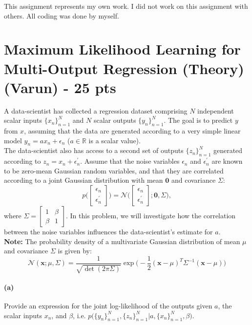 \documentclass{exam}
\def\R{\mathbb{R}}
\begin{document}
This assignment represents my own work. I did not work on this assignment with others. All coding was done by myself. \\

\newpage

\section{Maximum Likelihood Learning for Multi-Output Regression \nobreak (Theory) (Varun) - 25 pts}
A data-scientist has collected a regression dataset comprising $N$ independent scalar inputs $\{x_n\}_{n=1}^N$ and $N$ scalar outputs $\{y_n\}_{n=1}^N$. The goal is to predict $y$ from $x$, assuming that the data are generated according to a very simple linear model $y_n = ax_n + \epsilon_n$ ($a \in \R$ is a scalar value). \\
The data-scientist also has access to a second set of outputs $\{z_n\}_{n=1}^N$ generated according to $z_n = x_n + \epsilon^\prime_n$. Assume that the noise variables $\epsilon_n$ and $\epsilon^\prime_n$ are known to be zero-mean Gaussian random variables, and that they are correlated according to a joint Gaussian distribution with mean $\mathbf{0}$ and covariance $\Sigma$: 
\begin{equation}
p\Bigg(\begin{bmatrix}
\epsilon_n \\
\epsilon_n^\prime
\end{bmatrix}\Bigg) = \mathcal{N}\Bigg(\begin{bmatrix}
\epsilon_n \\
\epsilon_n^\prime
\end{bmatrix}; \mathbf{0}, \Sigma\Bigg),
\end{equation}
where $\Sigma = \begin{bmatrix}
1 & \beta \\
\beta & 1
\end{bmatrix}$. 
In this problem, we will investigate how the correlation between the noise variables influences the data-scientist's estimate for $a$.
\\

\textbf{Note:} The probability density of a multivariate Gaussian distribution of mean $\mu$ and covariance $\Sigma$ is given by: 
\begin{equation}
    \mathcal{N}(\mathbf{x}; \mu, \Sigma) = \frac{1}{\sqrt{\det(2\pi\Sigma)}}\exp\Big(-\frac{1}{2}(\mathbf{x}-\mu)^T\Sigma^{-1}(\mathbf{x}-\mu)\Big)
\end{equation}
\paragraph{(a)}Provide an expression for the joint log-likelihood of the outputs given $a$, the scalar inputs $x_n$, and $\beta$, i.e. $p\bigg(\{y_n\}_{n=1}^N,\{z_n\}_{n=1}^N\bigg|a,\{x_n\}_{n=1}^N, \beta\bigg)$. 
\end{document}
